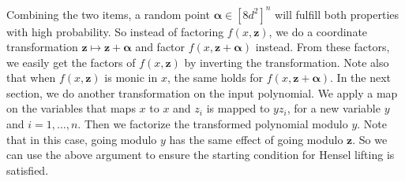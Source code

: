 \documentclass[10pt,a4paper]{article}
\begin{document}
Combining the two items, a random point $\boldsymbol\alpha\in[8d^2]^n$ will fulfill both properties with high probability. So instead of factoring $f(x,\mathbf z)$, we do a coordinate transformation $\mathbf z\mapsto\mathbf z+\boldsymbol\alpha$ and factor $f(x,\mathbf z+\boldsymbol\alpha)$ instead. From these factors, we easily get the factors of $f(x,\mathbf z)$ by inverting the transformation. Note also that when $f(x,\mathbf z)$ is monic in $x$, the same holds for $f(x,\mathbf z+\boldsymbol\alpha)$.
In the next section, we do another transformation on the input polynomial. We apply a map on the variables that maps $x$ to $x$ and $z_i$ is mapped to $yz_i$, for a new variable $y$ and $i=1,\ldots,n$. Then we factorize the transformed polynomial modulo $y$. Note that in this case, going modulo $y$ has the same effect of going modulo $\mathbf z$. So we can use the above argument to ensure the starting condition for Hensel lifting is satisfied.
\end{document}
